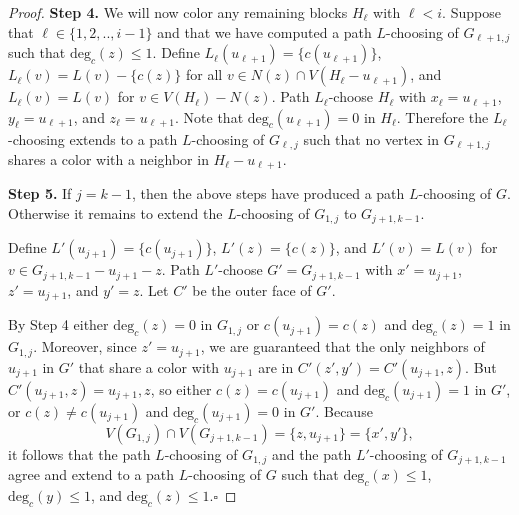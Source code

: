 \documentclass[12pt,letterpaper]{article}
\theoremstyle{plain}
\theoremstyle{definition}
\theoremstyle{break}
\newcommand{\ggcqedsymbol}{$\square$}
\newcommand{\ggcqed}{\hbox{}\nobreak\hbox{\quad\ggcqedsymbol}}
\newcommand{\ggcnopf}{\ggcqed}
\begin{document}
\begin{proof}
\textbf{Step 4.} We will
now color any remaining blocks $H_\ell$ with
$\ell<i$. Suppose that $\ell\in \{1,2,..,i-1\}$ and that we have
computed a path
$L$-choosing of $G_{\ell+1,j}$ such that $\text{deg}_c(z)\le 1$. Define
$L_\ell(u_{\ell+1})=\{c(u_{\ell+1})\}$,
$L_\ell(v)=L(v)-\{c(z)\}$
for all $v\in N(z)\cap V(H_\ell-u_{\ell+1})$,
and $L_\ell(v)=L(v)$ for $v\in V(H_\ell)-N(z)$. Path $L_\ell$-choose $H_\ell$ with
$x_\ell=u_{\ell+1}$, $y_\ell=u_{\ell+1}$, and $z_\ell=u_{\ell+1}$.
Note that $\text{deg}_c(u_{\ell+1})=0$ in $H_\ell$. Therefore the
$L_\ell$-choosing
extends to a path $L$-choosing of $G_{\ell,j}$ such that no vertex
in $G_{\ell+1,j}$ shares a color with a neighbor in $H_\ell-u_{\ell+1}$.

\textbf{Step 5.} If $j=k-1$, then the above steps have produced a path
$L$-choosing of $G$. Otherwise it remains to extend the $L$-choosing of
$G_{1,j}$ to $G_{j+1,k-1}$.

Define $L'(u_{j+1})=\{c(u_{j+1})\}$, $L'(z)=\{c(z)\}$, and $L'(v)=L(v)$ for
$v\in G_{j+1,k-1}-u_{j+1} -z$. 
Path $L'$-choose $G'=G_{j+1,k-1}$ with $x'=u_{j+1}$,
$z'=u_{j+1}$, and $y'=z$. Let $C'$ be the outer face of $G'$.

By Step 4 either $\text{deg}_c(z)=0$ in $G_{1,j}$ or
$c(u_{j+1})=c(z)$ and $\text{deg}_c(z)=1$ in $G_{1,j}$.
Moreover, since $z'=u_{j+1}$,
we are guaranteed that the only neighbors of
$u_{j+1}$ in $G'$ that share a color with $u_{j+1}$ are in
$C'(z',y')=C'(u_{j+1},z)$.
But $C'(u_{j+1},z)=u_{j+1},z$, so either $c(z)=c(u_{j+1})$
and $\text{deg}_c(u_{j+1})=1$ in $G'$, or $c(z)\ne c(u_{j+1})$ and
$\text{deg}_c(u_{j+1})=0$ in $G'$.
Because
$$V(G_{1,j})\cap V(G_{j+1,k-1})=\{z,u_{j+1}\}=\{x',y'\},$$
it follows that the path
$L$-choosing of $G_{1,j}$ and the path $L'$-choosing of $G_{j+1,k-1}$
agree and extend to a path $L$-choosing of $G$ such that
$\text{deg}_c(x)\le1$,
$\text{deg}_c(y)\le 1$, and $\text{deg}_c(z)\le 1$.\ggcnopf
\end{proof}
\end{document}
